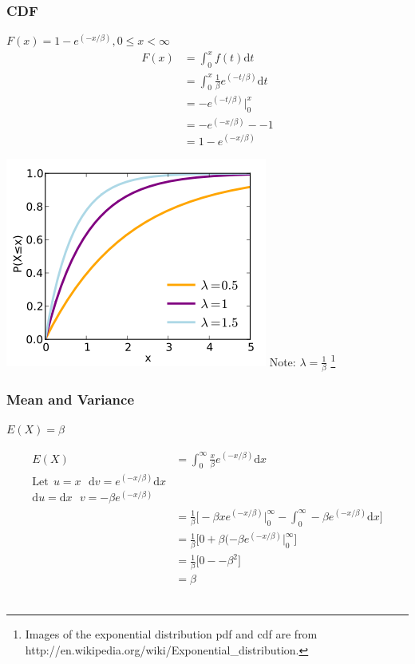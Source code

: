 \documentclass{article}
\begin{document}
\subsubsection*{CDF}
$F(x) = 1 - e^{(-x/\beta)} , 0\leq x < \infty$
\begin{align*}
F(x) &= \int_0^x f(t) \mathrm{d}t \\
&=  \int_0^x  \frac{1}{\beta}e^{(-t/\beta)} \mathrm{d}t \\
&= - e^{(-t/\beta)} \bigg\vert_0^x \\
&= - e^{(-x/\beta)} - -1 \\
&= 1  - e^{(-x/\beta)}
\end{align*}

\includegraphics[scale=.50]{expcdf.png}
Note: $\lambda = \frac{1}{\beta}$ 
\footnote{Images of the exponential distribution pdf and cdf are from http://en.wikipedia.org/wiki/Exponential\_distribution.}


\subsubsection*{Mean and Variance}

$E(X) = \beta$

\begin{align*}
E(X) &=  \int_0^\infty \frac{x}{\beta}e^{(-x/\beta)} \mathrm{d}x \\
\textrm{Let}\:\: u=x   \:\:\:    \mathrm{d}v = e^{(-x/\beta)} \mathrm{d}x \\
 \mathrm{d}u =  \mathrm{d}x       \:\:\:        v= - \beta  e^{(-x/\beta)}\\ 
&= \frac{1}{\beta}\bigg[ -\beta x  e^{(-x/\beta)} \bigg\vert_0^\infty - \int_0^\infty -\beta  e^{(-x/\beta)} \mathrm{d}x\bigg] \\
&=  \frac{1}{\beta}\bigg[0 + \beta(- \beta e^{(-x/\beta)} \bigg\vert_0^\infty\bigg] \\
&=  \frac{1}{\beta}\bigg[0- - \beta^2\bigg] \\
&= \beta
\end{align*}\\
\end{document}

